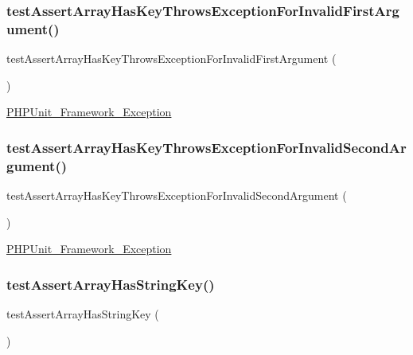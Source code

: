 \subsubsection{\texorpdfstring{test\+Assert\+Array\+Has\+Key\+Throws\+Exception\+For\+Invalid\+First\+Argument()}{testAssertArrayHasKeyThrowsExceptionForInvalidFirstArgument()}}
{\footnotesize\ttfamily test\+Assert\+Array\+Has\+Key\+Throws\+Exception\+For\+Invalid\+First\+Argument (\begin{DoxyParamCaption}{ }\end{DoxyParamCaption})}

\mbox{\hyperlink{class_p_h_p_unit___framework___exception}{P\+H\+P\+Unit\+\_\+\+Framework\+\_\+\+Exception}} \mbox{\label{class_framework___assert_test_a421cfe3899078a5c6f77e950e6b7792e}} 
\subsubsection{\texorpdfstring{test\+Assert\+Array\+Has\+Key\+Throws\+Exception\+For\+Invalid\+Second\+Argument()}{testAssertArrayHasKeyThrowsExceptionForInvalidSecondArgument()}}
{\footnotesize\ttfamily test\+Assert\+Array\+Has\+Key\+Throws\+Exception\+For\+Invalid\+Second\+Argument (\begin{DoxyParamCaption}{ }\end{DoxyParamCaption})}

\mbox{\hyperlink{class_p_h_p_unit___framework___exception}{P\+H\+P\+Unit\+\_\+\+Framework\+\_\+\+Exception}} \mbox{\label{class_framework___assert_test_a397bbb139540ddcaf0036ea1e36d638b}} 
\subsubsection{\texorpdfstring{test\+Assert\+Array\+Has\+String\+Key()}{testAssertArrayHasStringKey()}}
{\footnotesize\ttfamily test\+Assert\+Array\+Has\+String\+Key (\begin{DoxyParamCaption}{ }\end{DoxyParamCaption})}


